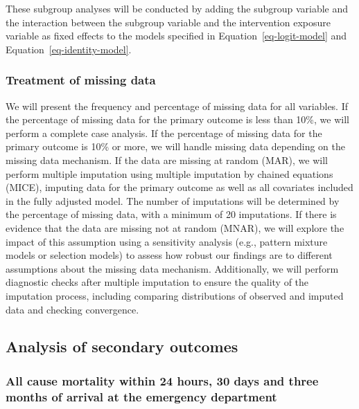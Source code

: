 \documentclass[
]{scrartcl}
\begin{document}
These subgroup analyses will be conducted by adding the subgroup
variable and the interaction between the subgroup variable and the
intervention exposure variable as fixed effects to the models specified
in Equation~\ref{eq-logit-model} and Equation~\ref{eq-identity-model}.

\hypertarget{treatment-of-missing-data}{%
\subsubsection{Treatment of missing
data}\label{treatment-of-missing-data}}

We will present the frequency and percentage of missing data for all
variables. If the percentage of missing data for the primary outcome is
less than 10\%, we will perform a complete case analysis. If the
percentage of missing data for the primary outcome is 10\% or more, we
will handle missing data depending on the missing data mechanism. If the
data are missing at random (MAR), we will perform multiple imputation
using multiple imputation by chained equations (MICE), imputing data for
the primary outcome as well as all covariates included in the fully
adjusted model. The number of imputations will be determined by the
percentage of missing data, with a minimum of 20 imputations. If there
is evidence that the data are missing not at random (MNAR), we will
explore the impact of this assumption using a sensitivity analysis
(e.g., pattern mixture models or selection models) to assess how robust
our findings are to different assumptions about the missing data
mechanism. Additionally, we will perform diagnostic checks after
multiple imputation to ensure the quality of the imputation process,
including comparing distributions of observed and imputed data and
checking convergence.

\hypertarget{analysis-of-secondary-outcomes}{%
\subsection{Analysis of secondary
outcomes}\label{analysis-of-secondary-outcomes}}

\hypertarget{all-cause-mortality-within-24-hours-30-days-and-three-months-of-arrival-at-the-emergency-department}{%
\subsubsection{All cause mortality within 24 hours, 30 days and three
months of arrival at the emergency
department}\label{all-cause-mortality-within-24-hours-30-days-and-three-months-of-arrival-at-the-emergency-department}}
\end{document}
